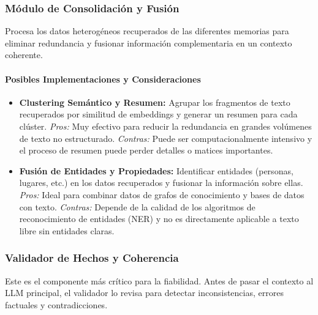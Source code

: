 \documentclass[conference]{IEEEtran}
\begin{document}
\subsubsection{Módulo de Consolidación y Fusión}
Procesa los datos heterogéneos recuperados de las diferentes memorias para eliminar redundancia y fusionar información complementaria en un contexto coherente.
\paragraph{Posibles Implementaciones y Consideraciones}
\begin{itemize}
    \item \textbf{Clustering Semántico y Resumen:} Agrupar los fragmentos de texto recuperados por similitud de embeddings y generar un resumen para cada clúster. \textit{Pros:} Muy efectivo para reducir la redundancia en grandes volúmenes de texto no estructurado. \textit{Contras:} Puede ser computacionalmente intensivo y el proceso de resumen puede perder detalles o matices importantes.
    \item \textbf{Fusión de Entidades y Propiedades:} Identificar entidades (personas, lugares, etc.) en los datos recuperados y fusionar la información sobre ellas. \textit{Pros:} Ideal para combinar datos de grafos de conocimiento y bases de datos con texto. \textit{Contras:} Depende de la calidad de los algoritmos de reconocimiento de entidades (NER) y no es directamente aplicable a texto libre sin entidades claras.
\end{itemize}

\subsubsection{Validador de Hechos y Coherencia}
Este es el componente más crítico para la fiabilidad. Antes de pasar el contexto al LLM principal, el validador lo revisa para detectar inconsistencias, errores factuales y contradicciones.
\end{document}
